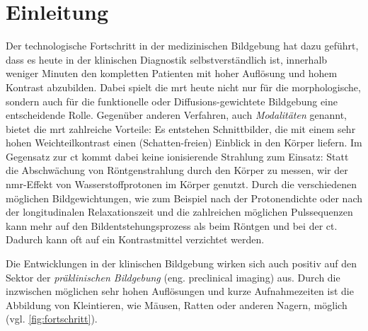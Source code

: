 \chapter{Einleitung}
Der technologische Fortschritt in der medizinischen Bildgebung hat dazu geführt, dass es heute in der klinischen Diagnostik selbstverständlich ist, innerhalb weniger Minuten den kompletten Patienten  mit hoher Auflösung und hohem Kontrast abzubilden.
Dabei spielt die \gls{mrt} heute nicht nur für die morphologische, sondern auch für die funktionelle oder Diffusions-gewichtete Bildgebung eine entscheidende Rolle. Gegenüber anderen Verfahren, auch \textit{Modalitäten} genannt, bietet die \gls{mrt} zahlreiche Vorteile: Es entstehen Schnittbilder, die mit einem sehr hohen Weichteilkontrast einen (Schatten-freien) Einblick in den Körper liefern. Im Gegensatz zur \gls{ct} kommt dabei keine ionisierende Strahlung zum Einsatz: Statt die Abschwächung von Röntgenstrahlung durch den Körper zu messen, wir der \gls{nmr}-Effekt von Wasserstoffprotonen im Körper genutzt. Durch die verschiedenen möglichen Bildgewichtungen, wie zum Beispiel nach der Protonendichte oder nach der longitudinalen Relaxationszeit und die zahlreichen möglichen Pulssequenzen kann mehr auf den Bildentstehungsprozess als beim Röntgen und bei der \gls{ct}. Dadurch kann oft auf ein Kontrastmittel verzichtet werden.

Die Entwicklungen in der klinischen Bildgebung wirken sich auch positiv auf den Sektor der \textit{präklinischen Bildgebung} (eng. preclinical imaging) aus. Durch die inzwischen möglichen sehr hohen Auflösungen und kurze Aufnahmezeiten ist die Abbildung von Kleintieren, wie Mäusen, Ratten oder anderen Nagern, möglich (vgl. \autoref{fig:fortschritt}). 

